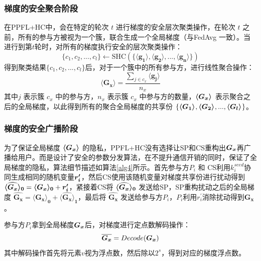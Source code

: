 \subsubsection{梯度的安全聚合阶段}
在PPFL+HC中，会在特定的轮次 $t$ 进行梯度的安全层次聚类操作，在轮次 $t$ 之前，所有的参与方被视为一个簇，联合生成一个全局梯度（与FedAvg \cite{mcmahan2017communication} 一致）。当进行到第$t$轮时，对所有的梯度执行安全的层次聚类操作：
\begin{equation}
	\{c_1,c_2,...,c_l \} \leftarrow \text{SHC}(\{\boldsymbol{\langle g_1\rangle}, \boldsymbol{\langle g_2\rangle},...,\boldsymbol{\langle g_n\rangle} \})
\end{equation}
得到聚类结果$\{c_1,c_2,...,c_l \}$后，对于一个簇中的所有参与方，进行线性聚合操作：
\begin{equation}
	\boldsymbol{\langle G_x\rangle} = \frac{\sum_{j \in c_x}\boldsymbol{\langle g_j\rangle}}{n_x}
\end{equation}
其中$j$ 表示簇 $c_x$ 中的参与方，$n_x$ 表示簇 $c_x$ 中参与方的数量，$\svec{G_x}$ 表示聚合之后的全局梯度，以此得到所有的聚合全局梯度的共享份 $\{\svec{G_1},\svec{G_2},...,\svec{G_l}\}$。


\subsubsection{梯度的安全广播阶段}\label{distribution} 
为了保证全局梯度 $\svec{G_x}$ 的隐私，PPFL+HC没有选择让SP和CS重构出$\bs{G_x}$再广播给用户。而是设计了安全的参数分发算法，在不提升通信开销的同时，保证了全局梯度的隐私，算法细节描述如算法\ref{alg4}所示。首先参与方$P_i$ 和 CS利用$k_i^{seed}$协同生成相同的随机变量$\bs{r_i^{\prime}}$，然后CS使用该随机变量对梯度共享份进行扰动得到 $\svec[0]{\widehat{G_x}} = \svec[0]{G_x} + \bs{r_i^{\prime}}$，紧接着CS将 $\svec[0]{\widehat{G_x}}$ 发送给SP，SP重构扰动之后的全局梯度 $\boldsymbol{\widehat{G_x}} = \boldsymbol{\langle G_x\rangle_0} + \boldsymbol{\langle \widehat{G_x}\rangle_1}$，最后将 $\boldsymbol{\widehat{G_x}}$ 发送给参与方$P_i$，$P_i$利用$r_i^{\prime}$消除扰动得到$\boldsymbol{G_x}$。

参与方$P_i$拿到全局梯度$\bs{G_x}$后，对梯度进行定点数解码操作：
\begin{equation}
	\bs{\overline{G_x}} = Decode(\bs{G_x})
\end{equation}
其中解码操作首先将元素$v$视为浮点数，然后除以$2^s$，得到对应的梯度浮点数。


